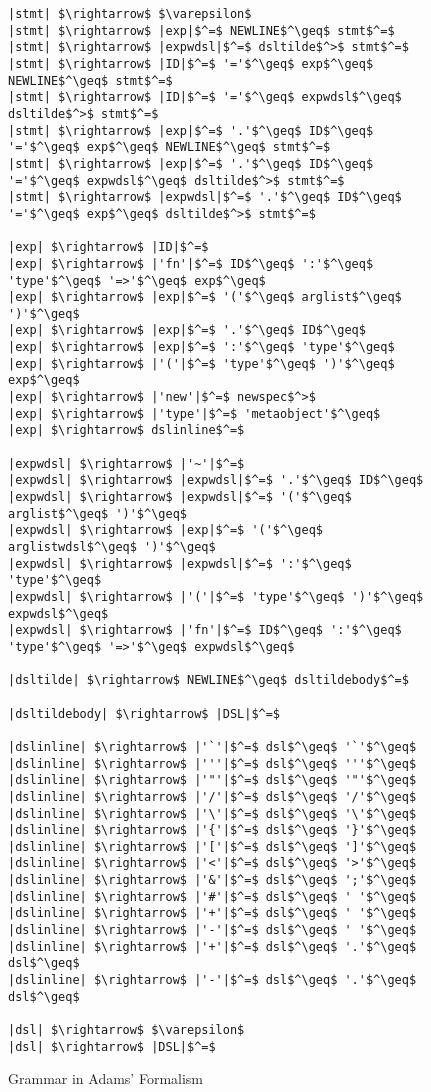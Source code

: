 
\begin{figure}
\begin{lstlisting}[mathescape]
|stmt| $\rightarrow$ $\varepsilon$
|stmt| $\rightarrow$ |exp|$^=$ NEWLINE$^\geq$ stmt$^=$
|stmt| $\rightarrow$ |expwdsl|$^=$ dsltilde$^>$ stmt$^=$
|stmt| $\rightarrow$ |ID|$^=$ '='$^\geq$ exp$^\geq$ NEWLINE$^\geq$ stmt$^=$
|stmt| $\rightarrow$ |ID|$^=$ '='$^\geq$ expwdsl$^\geq$ dsltilde$^>$ stmt$^=$
|stmt| $\rightarrow$ |exp|$^=$ '.'$^\geq$ ID$^\geq$ '='$^\geq$ exp$^\geq$ NEWLINE$^\geq$ stmt$^=$
|stmt| $\rightarrow$ |exp|$^=$ '.'$^\geq$ ID$^\geq$ '='$^\geq$ expwdsl$^\geq$ dsltilde$^>$ stmt$^=$
|stmt| $\rightarrow$ |expwdsl|$^=$ '.'$^\geq$ ID$^\geq$ '='$^\geq$ exp$^\geq$ dsltilde$^>$ stmt$^=$

|exp| $\rightarrow$ |ID|$^=$
|exp| $\rightarrow$ |'fn'|$^=$ ID$^\geq$ ':'$^\geq$ 'type'$^\geq$ '=>'$^\geq$ exp$^\geq$
|exp| $\rightarrow$ |exp|$^=$ '('$^\geq$ arglist$^\geq$ ')'$^\geq$
|exp| $\rightarrow$ |exp|$^=$ '.'$^\geq$ ID$^\geq$
|exp| $\rightarrow$ |exp|$^=$ ':'$^\geq$ 'type'$^\geq$
|exp| $\rightarrow$ |'('|$^=$ 'type'$^\geq$ ')'$^\geq$ exp$^\geq$
|exp| $\rightarrow$ |'new'|$^=$ newspec$^>$
|exp| $\rightarrow$ |'type'|$^=$ 'metaobject'$^\geq$
|exp| $\rightarrow$ dslinline$^=$

|expwdsl| $\rightarrow$ |'~'|$^=$
|expwdsl| $\rightarrow$ |expwdsl|$^=$ '.'$^\geq$ ID$^\geq$
|expwdsl| $\rightarrow$ |expwdsl|$^=$ '('$^\geq$ arglist$^\geq$ ')'$^\geq$
|expwdsl| $\rightarrow$ |exp|$^=$ '('$^\geq$ arglistwdsl$^\geq$ ')'$^\geq$
|expwdsl| $\rightarrow$ |expwdsl|$^=$ ':'$^\geq$ 'type'$^\geq$
|expwdsl| $\rightarrow$ |'('|$^=$ 'type'$^\geq$ ')'$^\geq$ expwdsl$^\geq$
|expwdsl| $\rightarrow$ |'fn'|$^=$ ID$^\geq$ ':'$^\geq$ 'type'$^\geq$ '=>'$^\geq$ expwdsl$^\geq$

|dsltilde| $\rightarrow$ NEWLINE$^\geq$ dsltildebody$^=$

|dsltildebody| $\rightarrow$ |DSL|$^=$

|dslinline| $\rightarrow$ |'`'|$^=$ dsl$^\geq$ '`'$^\geq$
|dslinline| $\rightarrow$ |'''|$^=$ dsl$^\geq$ '''$^\geq$
|dslinline| $\rightarrow$ |'"'|$^=$ dsl$^\geq$ '"'$^\geq$
|dslinline| $\rightarrow$ |'/'|$^=$ dsl$^\geq$ '/'$^\geq$
|dslinline| $\rightarrow$ |'\'|$^=$ dsl$^\geq$ '\'$^\geq$
|dslinline| $\rightarrow$ |'{'|$^=$ dsl$^\geq$ '}'$^\geq$
|dslinline| $\rightarrow$ |'['|$^=$ dsl$^\geq$ ']'$^\geq$
|dslinline| $\rightarrow$ |'<'|$^=$ dsl$^\geq$ '>'$^\geq$
|dslinline| $\rightarrow$ |'&'|$^=$ dsl$^\geq$ ';'$^\geq$
|dslinline| $\rightarrow$ |'#'|$^=$ dsl$^\geq$ ' '$^\geq$
|dslinline| $\rightarrow$ |'+'|$^=$ dsl$^\geq$ ' '$^\geq$
|dslinline| $\rightarrow$ |'-'|$^=$ dsl$^\geq$ ' '$^\geq$
|dslinline| $\rightarrow$ |'+'|$^=$ dsl$^\geq$ '.'$^\geq$ dsl$^\geq$
|dslinline| $\rightarrow$ |'-'|$^=$ dsl$^\geq$ '.'$^\geq$ dsl$^\geq$

|dsl| $\rightarrow$ $\varepsilon$
|dsl| $\rightarrow$ |DSL|$^=$
\end{lstlisting}
\caption{Grammar in Adams' Formalism}
\label{f-grammar}
\end{figure}
